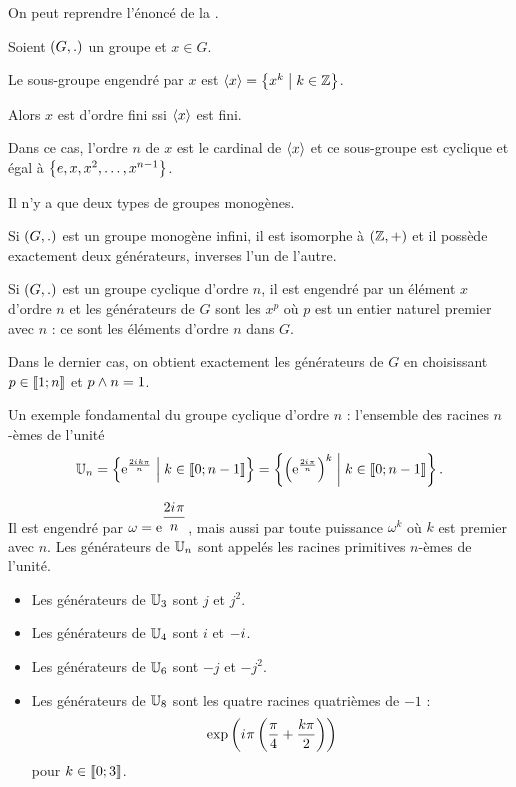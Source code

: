 On peut reprendre l'énoncé de la .

\begin{prop}
Soient \(\groupe{G}[.]\) un groupe et \(x\in G\).

Le sous-groupe engendré par \(x\) est \(\langle x\rangle=\left\lbrace x^k\;\middle|\; k\in\mathbb{Z}\right\rbrace\).

Alors \(x\) est d'ordre fini ssi \(\langle x\rangle\) est fini.

Dans ce cas, l'ordre \(n\) de \(x\) est le cardinal de \(\langle x\rangle\) et ce sous-groupe est cyclique et égal à \(\left\lbrace e,x,x^2,\dots,x^{n-1}\right\rbrace\).
\end{prop}

Il n'y a que deux types de groupes monogènes.

\begin{prop}
Si \(\groupe{G}[.]\) est un groupe monogène infini, il est isomorphe à \(\groupe{\Z}\) et il possède exactement deux générateurs, inverses l'un de l'autre.

Si \(\groupe{G}[.]\) est un groupe cyclique d'ordre \(n\), il est engendré par un élément \(x\) d'ordre \(n\) et les générateurs de \(G\) sont les \(x^p\) où \(p\) est un entier naturel premier avec \(n\) : ce sont les éléments d'ordre \(n\) dans \(G\).
\end{prop}

Dans le dernier cas, on obtient exactement les générateurs de \(G\) en choisissant \(p\in\left\llbracket1;n\right\rrbracket\) et \(p\land n=1\).

Un exemple fondamental du groupe cyclique d'ordre \(n\) : l'ensemble des racines \(n\)-èmes de l'unité \[\mathbb{U}_n=\left\lbrace\mathrm{e}^{\frac{2i\mkern1mu k\pi}{n}}\;\middle|\; k\in\left\llbracket0;n-1\right\rrbracket\right\rbrace=\left\lbrace\left(\mathrm{e}^{\frac{2i\mkern1mu\pi}{n}}\right)^k\;\middle|\; k\in\left\llbracket0;n-1\right\rrbracket\right\rbrace.\]

Il est engendré par \(\omega=\mathrm{e}^{\dfrac{2i\mkern1mu\pi}{n}}\), mais aussi par toute puissance \(\omega^k\) où \(k\) est premier avec \(n\). Les générateurs de \(\mathbb{U}_n\) sont appelés les racines primitives \(n\)-èmes de l'unité.

\begin{ex}
\begin{itemize}
    \item Les générateurs de \(\mathbb{U}_3\) sont \(j\) et \(j^2\). \\
    \item Les générateurs de \(\mathbb{U}_4\) sont \(i\) et \(-i\mkern1mu\). \\
    \item Les générateurs de \(\mathbb{U}_6\) sont \(-j\) et \(-j^2\). \\
    \item Les générateurs de \(\mathbb{U}_8\) sont les quatre racines quatrièmes de \(-1\) : \[\exp\left(i\mkern1mu\pi\left(\dfrac{\pi}{4}+\dfrac{k\pi}{2}\right)\right)\] pour \(k\in\left\llbracket0;3\right\rrbracket\).
\end{itemize}
\end{ex}

